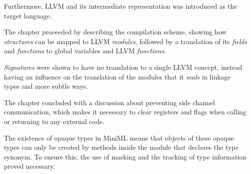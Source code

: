 Furthermore, LLVM and its intermediate representation was introduced as the target language.

The chapter proceeded by describing the compilation scheme, showing how \emph{structures} can be mapped to LLVM \emph{modules}, followed by a translation of its \emph{fields} and \emph{functions} to global variables and LLVM \emph{functions}.

\emph{Signatures} were shown to have no translation to a single LLVM concept, instead having an influence on the translation of the modules that it \emph{seals} in linkage types and more subtle ways.

The chapter concluded with a discussion about preventing side channel communication, which makes it necessary to clear registers and flags when calling or returning to any external code.

The existence of opaque types in \mbox{MiniML} means that objects of these opaque types can only be created by methods inside the module that declares the type synonym. To ensure this, the use of masking and the tracking of type information proved necessary.

